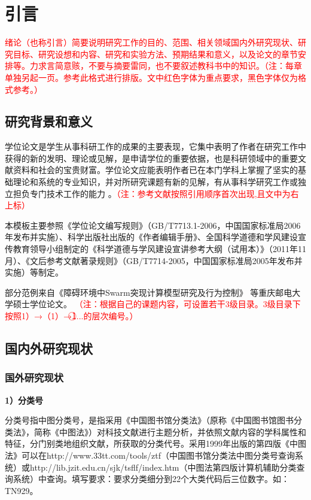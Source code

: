\chapter{引言}
\textcolor{red}{绪论（也称引言）简要说明研究工作的目的、范围、相关领域国内外研究现状、研究目标、研究设想和内容、研究和实验方法、预期结果和意义，以及论文的章节安排等。力求言简意赅，不要与摘要雷同，也不要叙述教科书中的知识。（注：每章单独另起一页。参考此格式进行排版。文中红色字体为重点要求，黑色字体仅为格式参考。）}
\section{研究背景和意义}
学位论文是学生从事科研工作的成果的主要表现，它集中表明了作者在研究工作中获得的新的发明、理论或见解，是申请学位的重要依据，也是科研领域中的重要文献资料和社会的宝贵财富。学位论文应能表明作者已在本门学科上掌握了坚实的基础理论和系统的专业知识，并对所研究课题有新的见解，有从事科学研究工作或独立担负专门技术工作的能力 。\textcolor{red}{（注：参考文献按照引用顺序首次出现,且文中为右上标）}

本模板主要参照《学位论文编写规则》（GB/T7713.1-2006，中国国家标准局2006年发布并实施）、科学出版社出版的《作者编辑手册》、全国科学道德和学风建设宣传教育领导小组制定的《科学道德与学风建设宣讲参考大纲（试用本）》（2011年11月）、《文后参考文献著录规则》（GB/T7714-2005，中国国家标准局2005年发布并实施）等制定。

部分范例来自《障碍环境中Swarm突现计算模型研究及行为控制》 等重庆邮电大学硕士学位论文。
\textcolor{red}{（注：根据自己的课题内容，可设置若干3级目录。3级目录下按照1）→（1）→\textcircled{1}...的层次编号。）}
\section{国内外研究现状}
\subsection{国外研究现状}
\textbf{1）分类号}

分类号指中图分类号，是指采用《中国图书馆分类法》（原称《中国图书馆图书分类法》，简称《中图法》）对科技文献进行主题分析，并依照文献内容的学科属性和特征，分门别类地组织文献，所获取的分类代号。采用1999年出版的第四版《中图法》可以在http://www.33tt.com/tools/ztf（中国图书馆分类法中图分类号查询系统）或http://lib.jzit.edu.cn/sjk/tsflf/index.htm（中图法第四版计算机辅助分类查询系统）中查询。填写要求：要求分类细分到22个大类代码后三位数字。如：TN929。


